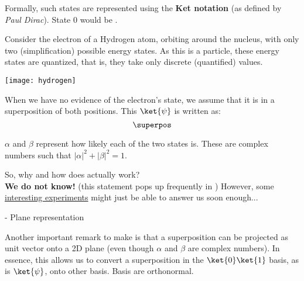 \documentclass[aspectratio=43]{beamer}
\begin{document}
\begin{frame}{\qsp}
    \begin{cardTiny}
        Formally, such states are represented using the \textbf{Ket notation} (as defined by \textit{Paul Dirac}). State 0 would be . 
    \end{cardTiny}
    \begin{cardTiny}
        \begin{multicols}{2}
    		Consider the electron of a Hydrogen atom, orbiting around the nucleus, with only two (simplification) possible energy states. As this is a \q particle, these energy states are quantized, that is, they take only discrete (quantified) values. 
    		\begin{center}
    		\texttt{[image: hydrogen]}
    		\end{center}
	    \end{multicols}
    \end{cardTiny}
\pagenumber
\end{frame}

\begin{frame}{\qsp}
    \begin{card}
        When we have no evidence of the electron's state, we assume that it is in a superposition of both positions. This \qsp $\ket{\psi}$ is written as:
	\begin{equation*}
	    \superpos
	\end{equation*}
    \end{card}
    \begin{cardTiny}
        $\alpha$ and $\beta$ represent how likely each of the two states is. These are complex numbers such that $|\alpha|^2 + |\beta|^2 = 1$. 
    \end{cardTiny}
    \begin{cardTiny}
        \small{
        So, why and how does \qsp actually work?\\ \textbf{We do not know!} (this statement pops up frequently in \q) However, some \href{https://arxiv.org/abs/1707.09483}{interesting experiments} might just be able to answer us soon enough...
        }
    \end{cardTiny}
\pagenumber
\end{frame}

\begin{frame}{\qsp\space-  Plane representation}
    \begin{cardTiny}
        \begin{multicols}{2}
    		Another important remark to make is that a superposition can be projected as unit vector onto a 2D plane (even though $\alpha$ and $\beta$ are complex numbers). In essence, this allows us to convert a superposition in the $\ket{0}\ket{1}$ basis, as is $\ket{\psi}$, onto other basis. Basis are orthonormal.
    		\begin{center}
                
    		\end{center}
	    \end{multicols}
    \end{cardTiny}
\pagenumber
\end{frame}
\end{document}
